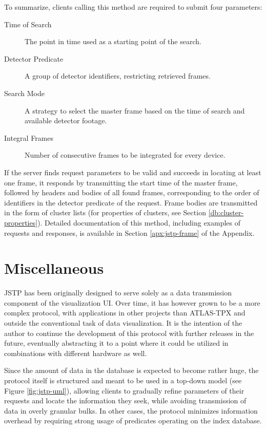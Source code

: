 To summarize, clients calling this method are required to submit four parameters:
\begin{description}
	\item[Time of Search]
	The point in time used as a starting point of the search.

	\item[Detector Predicate]
	A group of detector identifiers, restricting retrieved frames.

	\item[Search Mode]
	A strategy to select the master frame based on the time of search and available detector footage.

	\item[Integral Frames]
	Number of consecutive frames to be integrated for every device.
\end{description}

If the server finds request parameters to be valid and succeeds in locating at least one frame, it responds by transmitting the start time of the master frame, followed by headers and bodies of all found frames, corresponding to the order of identifiers in the detector predicate of the request. Frame bodies are transmitted in the form of cluster lists (for properties of clusters, see Section \ref{db:cluster-properties}). Detailed documentation of this method, including examples of requests and responses, is available in Section \ref{apx:jstp-frame} of the Appendix.

\section{Miscellaneous}
JSTP has been originally designed to serve solely as a data transmission component of the visualization UI. Over time, it has however grown to be a more complex protocol, with applications in other projects than ATLAS-TPX and outside the conventional task of data visualization. It is the intention of the author to continue the development of this protocol with further releases in the future, eventually abstracting it to a point where it could be utilized in combinations with different hardware as well.

Since the amount of data in the database is expected to become rather huge, the protocol itself is structured and meant to be used in a top-down model (see Figure \ref{fig:jstp-uml}), allowing clients to gradually refine parameters of their requests and locate the information they seek, while avoiding transmission of data in overly granular bulks. In other cases, the protocol minimizes information overhead by requiring strong usage of predicates operating on the index database.


